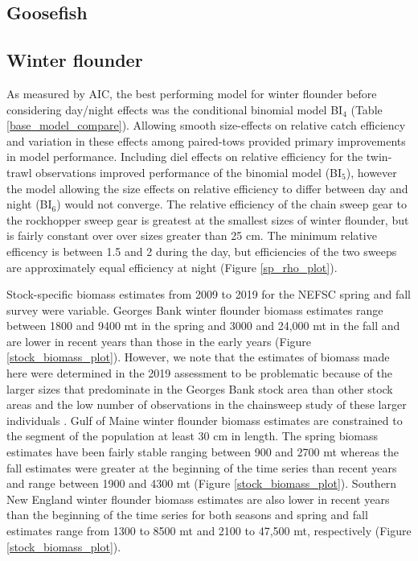 \documentclass[]{article}
\begin{document}
\hypertarget{goosefish}{%
\subsection{Goosefish}\label{goosefish}}

\hypertarget{winter-flounder}{%
\subsection{Winter flounder}\label{winter-flounder}}

As measured by AIC, the best performing model for winter flounder before
considering day/night effects was the conditional binomial model
BI\(_4\) (Table \ref{base_model_compare}). Allowing smooth size-effects
on relative catch efficiency and variation in these effects among
paired-tows provided primary improvements in model performance.
Including diel effects on relative efficiency for the twin-trawl
observations improved performance of the binomial model (BI\(_5\)),
however the model allowing the size effects on relative efficiency to
differ between day and night (BI\(_6\)) would not converge. The relative
efficiency of the chain sweep gear to the rockhopper sweep gear is
greatest at the smallest sizes of winter flounder, but is fairly
constant over over sizes greater than 25 cm. The minimum relative
efficency is between 1.5 and 2 during the day, but efficiencies of the
two sweeps are approximately equal efficiency at night (Figure
\ref{sp_rho_plot}).

Stock-specific biomass estimates from 2009 to 2019 for the NEFSC spring
and fall survey were variable. Georges Bank winter flounder biomass
estimates range between 1800 and 9400 mt in the spring and 3000 and
24,000 mt in the fall and are lower in recent years than those in the
early years (Figure \ref{stock_biomass_plot}). However, we note that the
estimates of biomass made here were determined in the 2019 assessment to
be problematic because of the larger sizes that predominate in the
Georges Bank stock area than other stock areas and the low number of
observations in the chainsweep study of these larger individuals
\citep{nefsc2020}. Gulf of Maine winter flounder biomass estimates are
constrained to the segment of the population at least 30 cm in length.
The spring biomass estimates have been fairly stable ranging between 900
and 2700 mt whereas the fall estimates were greater at the beginning of
the time series than recent years and range between 1900 and 4300 mt
(Figure \ref{stock_biomass_plot}). Southern New England winter flounder
biomass estimates are also lower in recent years than the beginning of
the time series for both seasons and spring and fall estimates range
from 1300 to 8500 mt and 2100 to 47,500 mt, respectively (Figure
\ref{stock_biomass_plot}).
\end{document}
